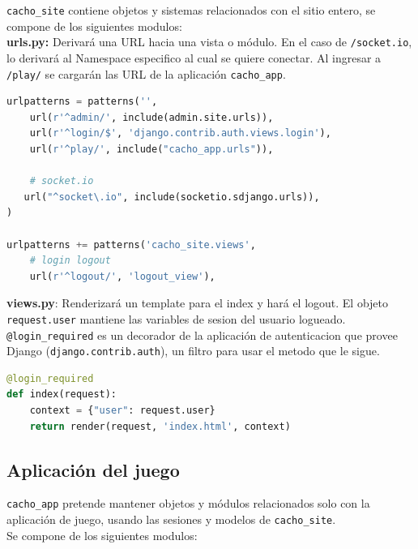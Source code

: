 \documentclass[a4paper,11pt]{article}
\begin{document}
\texttt{cacho\_site} contiene objetos y sistemas
relacionados con el sitio entero, se compone de los siguientes modulos:\\

\textbf{urls.py:} Derivará una URL hacia una vista o módulo.
En el caso de \texttt{/socket.io}, lo derivará al Namespace especifico
al cual se quiere conectar. Al ingresar a \texttt{/play/} se cargarán las URL
de la aplicación \texttt{cacho\_app}.
\begin{lstlisting}[language=Python, caption=cacho\_site/urls.py]
urlpatterns = patterns('',
	url(r'^admin/', include(admin.site.urls)),
	url(r'^login/$', 'django.contrib.auth.views.login'),
	url(r'^play/', include("cacho_app.urls")),

	# socket.io
   url("^socket\.io", include(socketio.sdjango.urls)),
)

urlpatterns += patterns('cacho_site.views', 
	# login logout
	url(r'^logout/', 'logout_view'),
\end{lstlisting}
\vspace{1cm}
\textbf{views.py}: Renderizará un template para el index y hará el logout.
El objeto \texttt{request.user} mantiene las variables de sesion del usuario logueado.
\texttt{@login\_required} es un decorador de la aplicación de autenticacion que provee
Django (\texttt{django.contrib.auth}), un filtro para usar el metodo que le sigue.
\begin{lstlisting}[language=Python, caption=cacho\_site/views.py]
@login_required
def index(request):
	context = {"user": request.user}
	return render(request, 'index.html', context)
\end{lstlisting}

\newpage
\subsection{Aplicación del juego}
\texttt{cacho\_app} pretende mantener objetos y módulos relacionados solo
con la aplicación de juego, usando las sesiones y modelos de \texttt{cacho\_site}.\\

Se compone de los siguientes modulos:\\
\end{document}
